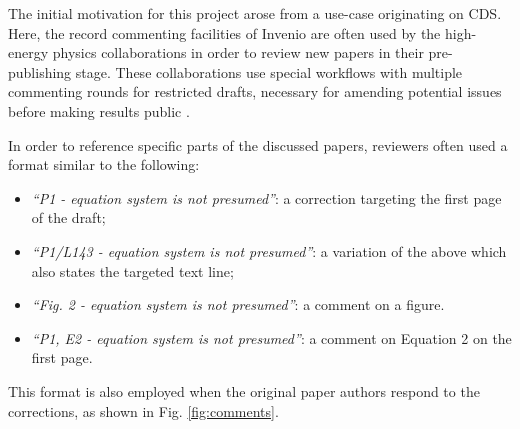 
The initial motivation for this project arose from a use-case originating on
CDS.  Here, the record commenting facilities of Invenio are often used by the
high-energy physics collaborations in order to review new papers in their
pre-publishing stage.  These collaborations use special workflows with multiple
commenting rounds for restricted drafts, necessary for amending potential
issues before making results public \cite{ref:ludmila}.

In order to reference specific parts of the discussed papers, reviewers often
used a format similar to the following:
  \begin{itemize}
      \item \textit{``P1 - equation system is not presumed''}: a correction
          targeting the first page of the draft;
      \item \textit{``P1/L143 - equation system is not presumed''}: a variation
        of the above which also states the targeted text line;
      \item \textit{``Fig. 2 - equation system is not presumed''}: a comment on
        a figure.
      \item \textit{``P1, E2 - equation system is not presumed''}: a comment on
        Equation 2 on the first page.
  \end{itemize}
This format is also employed when the original paper authors respond to the
corrections, as shown in Fig. \ref{fig:comments}.

